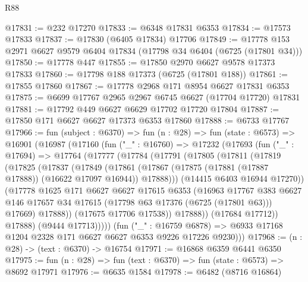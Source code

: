 \begin{lexlean}{R88}
\begin{coremodule}
@17831 := @232 @17270
@17833 := @6348 @17831 @6353
@17834 := @17573 @17833
@17837 := @17830 (@6405 @17834) @17706
@17849 := @17778 @153 @2971 @6627 @9579 @6404 @17834 (@17798 @34 @6404 (@6725 (@17801 @34)))
@17850 := @17778 @447
@17855 := @17850 @2970 @6627 @9578 @17373 @17833
@17860 := @17798 @188 @17373 (@6725 (@17801 @188))
@17861 := @17855 @17860
@17867 := @17778 @2968 @171 @8954 @6627 @17831 @6353
@17875 := @6699 @17767 @2965 @2967 @6745 @6627 (@17704 @17720) @17831
@17881 := @17792 @449 @6627 @6629 @17702 @17720 @17804
@17887 := @17850 @171 @6627 @6627 @17373 @6353 @17860
@17888 := @6733 @17767
@17966 := fun (subject : @6370) =>
  fun (n : @28) =>
  fun (state : @6573) =>
  @16901
    (@16987
      (@17160
        (fun ("_" : @16760) =>
        @17232
          (@17693
            (fun ("_" : @17694) =>
            @17764
              (@17777
                (@17784
                  (@17791
                    (@17805
                      (@17811
                        (@17819
                          (@17825
                            (@17837
                              (@17849
                                (@17861
                                  (@17867
                                    (@17875 (@17881 (@17887 @17888)) (@16622 @17097 @16944))
                                    @17888)))
                              (@14415 @6403 @16944 @17270))
                            (@17778
                              @1625
                              @171
                              @6627
                              @6627
                              @17615
                              @6353
                              (@16963
                                @17767
                                @383
                                @6627
                                @146
                                @17657
                                @34
                                @17615
                                (@17798 @63 @17376 (@6725 (@17801 @63)))
                                @17669)
                              @17888))
                          (@17675 @17706 @17538))
                        @17888))
                    (@17684 @17712))
                  @17888)
                (@9444 @17713)))))
        (fun ("_" : @16759 @6878) =>
        @6933 @17168 @1204 @2328 @171 @6627 @6627 @6353 @9226 @17226 @9230)))
@17968 := (n : @28) -> (text : @6370) -> @16754
@17971 := @16868 @6359 @6441 @6350
@17975 := fun (n : @28) => fun (text : @6370) => fun (state : @6573) => @8692 @17971
@17976 := @6635 @1584
@17978 := @6482 (@8716 @16864)

\end{coremodule}
\end{lexlean}
